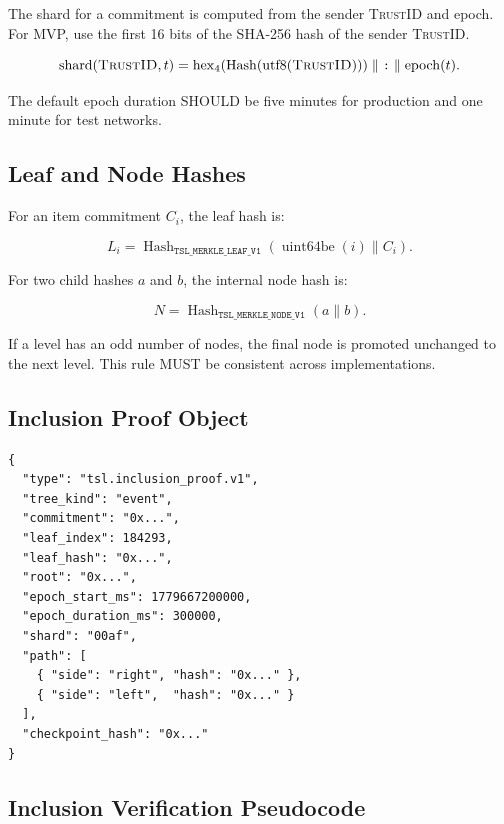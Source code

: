 \documentclass[11pt]{article}
\newcommand{\TrustID}{\textsc{TrustID}}
\newcommand{\hash}{\operatorname{Hash}}
\begin{document}
The shard for a commitment is computed from the sender \TrustID{} and epoch. For MVP, use the first 16 bits of the SHA-256 hash of the sender \TrustID{}.

\begin{equation}
\operatorname{shard}(\TrustID, t) = \operatorname{hex}_{4}(\hash(\operatorname{utf8}(\TrustID))) \parallel \texttt{:} \parallel \operatorname{epoch}(t).
\end{equation}

The default epoch duration SHOULD be five minutes for production and one minute for test networks.

\subsection{Leaf and Node Hashes}

For an item commitment \(C_i\), the leaf hash is:

\begin{equation}
L_i = \hash_{\texttt{TSL\_MERKLE\_LEAF\_V1}}(\operatorname{uint64be}(i) \parallel C_i).
\end{equation}

For two child hashes \(a\) and \(b\), the internal node hash is:

\begin{equation}
N = \hash_{\texttt{TSL\_MERKLE\_NODE\_V1}}(a \parallel b).
\end{equation}

If a level has an odd number of nodes, the final node is promoted unchanged to the next level. This rule MUST be consistent across implementations.

\subsection{Inclusion Proof Object}

\begin{lstlisting}[style=tslcode]
{
  "type": "tsl.inclusion_proof.v1",
  "tree_kind": "event",
  "commitment": "0x...",
  "leaf_index": 184293,
  "leaf_hash": "0x...",
  "root": "0x...",
  "epoch_start_ms": 1779667200000,
  "epoch_duration_ms": 300000,
  "shard": "00af",
  "path": [
    { "side": "right", "hash": "0x..." },
    { "side": "left",  "hash": "0x..." }
  ],
  "checkpoint_hash": "0x..."
}
\end{lstlisting}

\subsection{Inclusion Verification Pseudocode}
\end{document}
